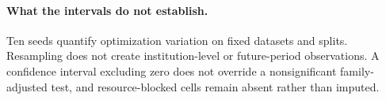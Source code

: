 \paragraph{What the intervals do not establish.}
Ten seeds quantify optimization variation on fixed datasets and splits. Resampling does not create institution-level or future-period observations. A confidence interval excluding zero does not override a nonsignificant family-adjusted test, and resource-blocked cells remain absent rather than imputed.
